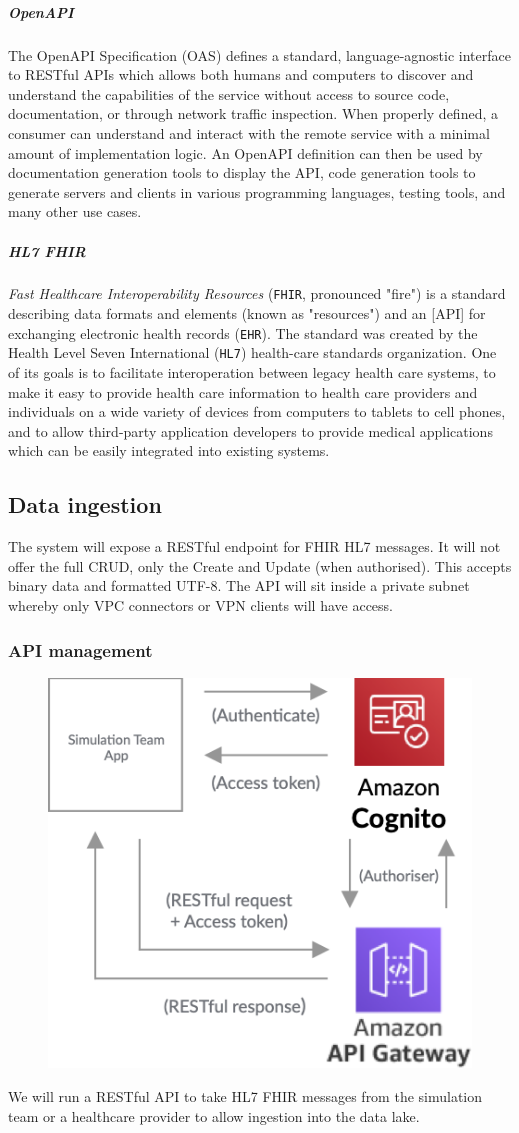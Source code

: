 \documentclass[10pt]{article}
\begin{document}
\subparagraph{OpenAPI}
The OpenAPI Specification (OAS) defines a standard, language-agnostic interface to RESTful APIs which allows both humans and computers to discover and understand the capabilities of the service without access to source code, documentation, or through network traffic inspection. When properly defined, a consumer can understand and interact with the remote service with a minimal amount of implementation logic. An OpenAPI definition can then be used by documentation generation tools to display the API, code generation tools to generate servers and clients in various programming languages, testing tools, and many other use cases. \cite{openapi}

\subparagraph{HL7 FHIR}
\textit{Fast Healthcare Interoperability Resources} (\texttt{FHIR}, pronounced "fire") is a standard describing data formats and elements (known as "resources") and an [API] for exchanging electronic health records (\texttt{EHR}). The standard was created by the Health Level Seven International (\texttt{HL7}) health-care standards organization. One of its goals is to facilitate interoperation between legacy health care systems, to make it easy to provide health care information to health care providers and individuals on a wide variety of devices from computers to tablets to cell phones, and to allow third-party application developers to provide medical applications which can be easily integrated into existing systems. \cite{fhir}

\subsection{Data ingestion}
The system will expose a RESTful endpoint for FHIR HL7 messages. It will not offer the full CRUD, only the Create and Update (when authorised). This accepts binary data and formatted UTF-8. The API will sit inside a private subnet whereby only VPC connectors or VPN clients will have access.
\subsubsection{API management}
\begin{figure}[h!]
	\centering
	\includegraphics[width=0.4\linewidth]{images/APIGateway.png}
\end{figure}
We will run a RESTful API to take HL7 FHIR messages from the simulation team or a healthcare provider to allow ingestion into the data lake.
\end{document}
